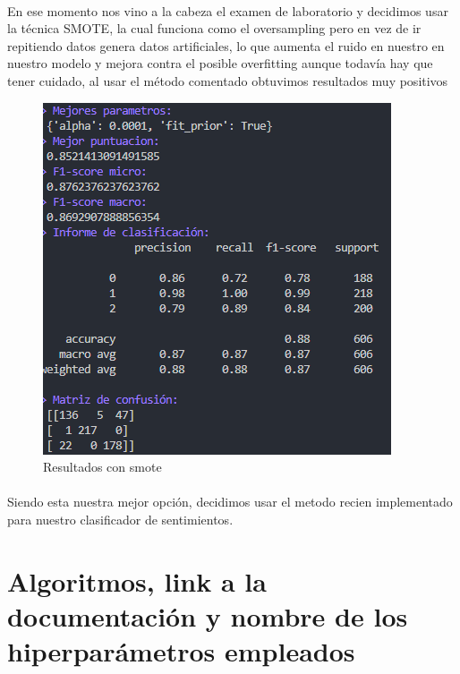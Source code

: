 \documentclass{report}
\begin{document}
{{                \paragraph{}{
                    En ese momento nos vino a la cabeza el examen de laboratorio y decidimos usar la técnica SMOTE, la cual funciona como el oversampling pero en vez de ir repitiendo datos genera datos artificiales, lo que aumenta el ruido en nuestro en nuestro modelo y mejora contra el posible overfitting aunque todavía hay que tener cuidado, al usar el método comentado obtuvimos resultados muy positivos \color{green}{Mejor puntuacion:}
                }
                \begin{figure}[H]
                    \centering
                    \includegraphics[width=\textwidth]{img/SMOTE.png}
                    \caption{Resultados con smote}
                \end{figure}
                \paragraph*{}{
                Siendo esta nuestra mejor opción, decidimos usar el metodo recien implementado para nuestro clasificador de sentimientos.
                }
        \clearpage\section{Algoritmos, link a la documentación y nombre de los hiperparámetros empleados}
}}
\end{document}
